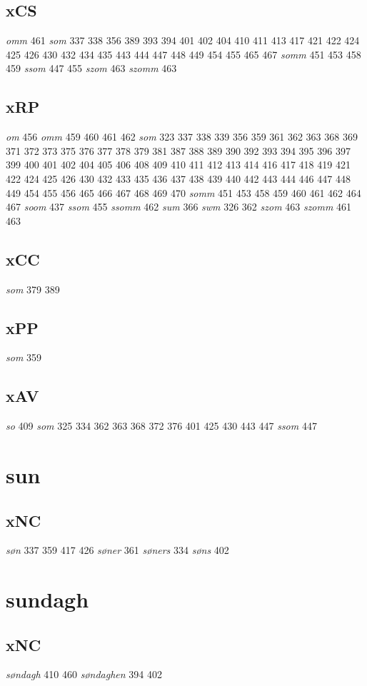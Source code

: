 \documentclass[a4paper,twocolumn]{article}
\begin{document}
\subsection{xCS}
\label{sec:org4fcf030}
\emph{omm} 461 \emph{som} 337 338 356 389 393 394 401 402 404 410 411 413 417 421 422 424 425 426 430 432 434 435 443 444 447 448 449 454 455 465 467 \emph{somm} 451 453 458 459 \emph{ssom} 447 455 \emph{szom} 463 \emph{szomm} 463 
\subsection{xRP}
\label{sec:org9188ca2}
\emph{om} 456 \emph{omm} 459 460 461 462 \emph{som} 323 337 338 339 356 359 361 362 363 368 369 371 372 373 375 376 377 378 379 381 387 388 389 390 392 393 394 395 396 397 399 400 401 402 404 405 406 408 409 410 411 412 413 414 416 417 418 419 421 422 424 425 426 430 432 433 435 436 437 438 439 440 442 443 444 446 447 448 449 454 455 456 465 466 467 468 469 470 \emph{somm} 451 453 458 459 460 461 462 464 467 \emph{soom} 437 \emph{ssom} 455 \emph{ssomm} 462 \emph{sum} 366 \emph{swm} 326 362 \emph{szom} 463 \emph{szomm} 461 463 
\subsection{xCC}
\label{sec:org7b6a5be}
\emph{som} 379 389 
\subsection{xΡP}
\label{sec:org653259a}
\emph{som} 359 
\subsection{xAV}
\label{sec:org82cae87}
\emph{so} 409 \emph{som} 325 334 362 363 368 372 376 401 425 430 443 447 \emph{ssom} 447 
\section{sun}
\label{sec:org6b8bea2}
\subsection{xNC}
\label{sec:orgcfc40bb}
\emph{søn} 337 359 417 426 \emph{søner} 361 \emph{søners} 334 \emph{søns} 402 
\section{sundagh}
\label{sec:org8866d3e}
\subsection{xNC}
\label{sec:orgf0be96f}
\emph{søndagh} 410 460 \emph{søndaghen} 394 402 
\end{document}
